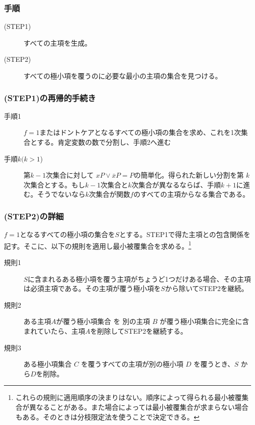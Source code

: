 \documentclass[a4j,10pt,oneside,openany,fleqn]{jsbook}
\begin{document}
\subsubsection{手順}
\begin{description}
\item [(STEP1)] すべての主項を生成。
\item [(STEP2)] すべての極小項を覆うのに必要な最小の主項の集合を見つける。
\end{description}

\subsubsection{(STEP1)の再帰的手続き}
\begin{description}
  \item [手順1]$f=1$またはドントケアとなるすべての極小項の集合を求め、これを1次集合とする。肯定変数の数で分割し、手順2へ進む
  \item [手順$k(k>1$)]第$k-1$次集合に対して $xP\vee\overline{x}P=P$の簡単化。得られた新しい分割を第 $k$ 次集合とする。もし$k-1$次集合と$k$次集合が異なるならば、手順$k+1$に進む。そうでないなら$k$次集合が関数$f$のすべての主項からなる集合である。
\end{description}

\subsubsection{(STEP2)の詳細}
$f=1$となるすべての極小項の集合を$S$とする。STEP1で得た主項との包含関係を記す。そこに、以下の規則を適用し最小被覆集合を求める。\footnote{これらの規則に適用順序の決まりはない。順序によって得られる最小被覆集合が異なることがある。また場合によっては最小被覆集合が求まらない場合もある。そのときは分枝限定法を使うことで決定できる。}
\begin{description}
\item [規則1]$S$に含まれるある極小項を覆う主項がちょうど1つだけある場合、その主項は必須主項である。その主項が覆う極小項を$S$から除いてSTEP2を継続。
\item [規則2]ある主項$A$が覆う極小項集合 を 別の主項 $B$ が覆う極小項集合に完全に含まれていたら、主項$A$を削除してSTEP2を継続する。
\item [規則3]ある極小項集合 $C$ を覆うすべての主項が別の極小項 $D$ を覆うとき、$S$ から$D$を削除。
\end{description}
\end{document}
